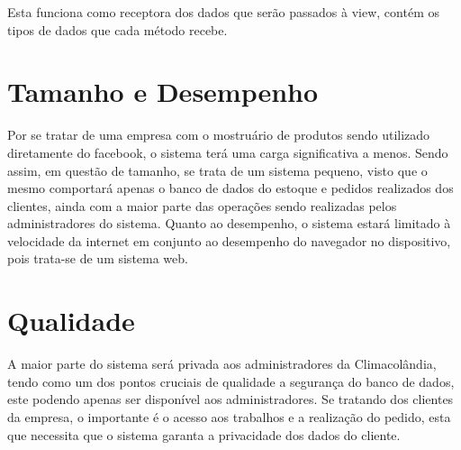 Esta funciona como receptora dos dados que serão passados à view, contém os tipos de dados que cada método recebe.

\section{Tamanho e Desempenho}

Por se tratar de uma empresa com o mostruário de produtos sendo utilizado diretamente do facebook, o sistema terá uma carga significativa a menos. Sendo assim, em questão de tamanho, se trata de um sistema pequeno, visto que o mesmo comportará apenas o banco de dados do estoque e pedidos realizados dos clientes, ainda com a maior parte das operações sendo realizadas pelos administradores do sistema. Quanto ao desempenho, o sistema estará limitado à velocidade da internet em conjunto ao desempenho do navegador no dispositivo, pois trata-se de um sistema web.

\section{Qualidade}

A maior parte do sistema será privada aos administradores da Climacolândia, tendo como um dos pontos cruciais de qualidade a segurança do banco de dados, este podendo apenas ser disponível aos administradores. Se tratando dos clientes da empresa, o importante é o acesso aos trabalhos e a realização do pedido, esta que necessita que o sistema garanta a privacidade dos dados do cliente. 